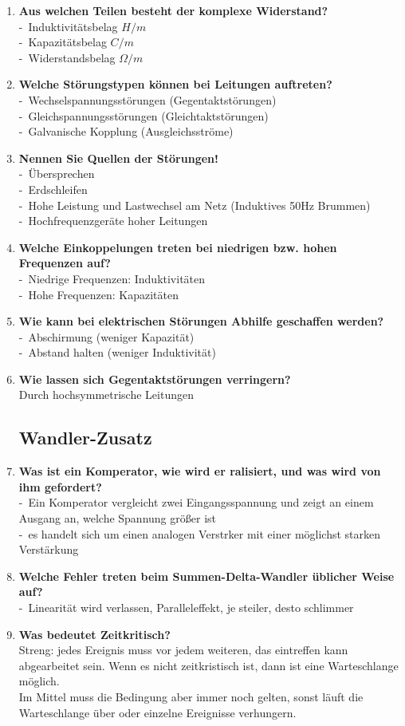 \documentclass[a4paper,12pt]{article}
\newcommand{\questionnopage}[2]{\pagebreak[3]\item {\textbf{#1?}}#2}
\newcommand{\statementnopage}[2]{\pagebreak[3]\item {\textbf{#1!}}#2}
\newcommand{\catchword}[1]{\\-\ #1}
\newcommand{\normaltext}[1]{\\#1}
\begin{document}
\begin{enumerate}
  \questionnopage{Aus welchen Teilen besteht der komplexe Widerstand}
  {
    \catchword{Induktivitätsbelag $H/m$}
    \catchword{Kapazitätsbelag $C/m$}
    \catchword{Widerstandsbelag $\Omega/m$}
  }

  \questionnopage{Welche Störungstypen können bei Leitungen auftreten}
  {
    \catchword{Wechselspannungsstörungen (Gegentaktstörungen)}
    \catchword{Gleichspannungsstörungen (Gleichtaktstörungen)}
    \catchword{Galvanische Kopplung (Ausgleichsströme)}
  }

  \statementnopage{Nennen Sie Quellen der Störungen}
  {
    \catchword{Übersprechen}
    \catchword{Erdschleifen}
    \catchword{Hohe Leistung und Lastwechsel am Netz (Induktives 50Hz Brummen)}
    \catchword{Hochfrequenzgeräte hoher Leitungen}
  }

  \questionnopage{Welche Einkoppelungen treten bei niedrigen bzw. hohen Frequenzen auf}
  {
    \catchword{Niedrige Frequenzen: Induktivitäten}
    \catchword{Hohe Frequenzen: Kapazitäten}
  }

  \questionnopage{Wie kann bei elektrischen Störungen Abhilfe geschaffen werden}
  {
    \catchword{Abschirmung (weniger Kapazität)}
    \catchword{Abstand halten (weniger Induktivität)}
  }

  \questionnopage{Wie lassen sich Gegentaktstörungen verringern}
  {
    \normaltext{Durch hochsymmetrische Leitungen}
  }
  
  
  
  
  
  
  \subsection{Wandler-Zusatz}
  
\questionnopage{Was ist ein Komperator, wie wird er ralisiert, und was wird von 
ihm gefordert}
  {
    \catchword{Ein Komperator vergleicht zwei Eingangsspannung 
    und zeigt an einem Ausgang an, welche Spannung größer ist}
    \catchword{es handelt sich um einen analogen Verstrker mit einer möglichst
    starken Verstärkung}
  }
  
  \questionnopage{Welche Fehler treten beim Summen-Delta-Wandler üblicher Weise auf}
  {
      \catchword{Linearität wird verlassen, Paralleleffekt, je steiler, desto schlimmer}
  }
  
   \questionnopage{Was bedeutet Zeitkritisch}
  {
   \normaltext{Streng: jedes Ereignis muss vor jedem weiteren, das eintreffen kann
   abgearbeitet sein. Wenn es nicht zeitkristisch ist, dann ist eine Warteschlange 
   möglich.}
   \normaltext{Im Mittel muss die Bedingung aber immer noch gelten, sonst läuft
   die Warteschlange über oder einzelne Ereignisse verhungern.}
  
}
\end{enumerate}
\end{document}
